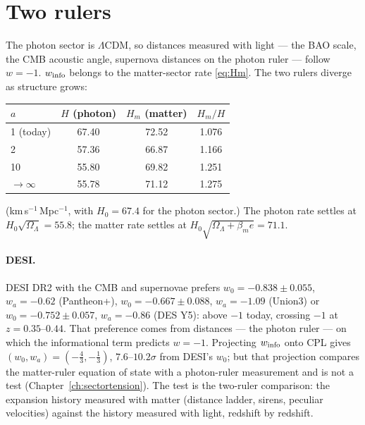 \section{Two rulers}
The photon sector is $\Lambda$CDM, so distances measured with light --- the BAO scale, the CMB acoustic angle, supernova distances on the photon
ruler --- follow $w=-1$. $w_{\rm info}$ belongs to the matter-sector rate \eqref{eq:Hm}. The two rulers diverge as structure grows:
\begin{center}\small\begin{tabular}{lccc}\toprule
$a$ & $H$ (photon) & $H_m$ (matter) & $H_m/H$\\\midrule
1 (today) & 67.40 & 72.52 & 1.076\\ 2 & 57.36 & 66.87 & 1.166\\ 10 & 55.80 & 69.82 & 1.251\\ $\to\infty$ & 55.78 & 71.12 & 1.275\\\bottomrule
\end{tabular}\end{center}
(km\,s$^{-1}$\,Mpc$^{-1}$, with $H_0=67.4$ for the photon sector.) The photon rate settles at $H_0\sqrt{\Omega_\Lambda}=55.8$; the matter rate
settles at $H_0\sqrt{\Omega_\Lambda+\beta_me}=71.1$.

\paragraph{DESI.} DESI DR2 with the CMB and supernovae prefers $w_0=-0.838\pm0.055$, $w_a=-0.62$ (Pantheon+), $w_0=-0.667\pm0.088$, $w_a=-1.09$
(Union3) or $w_0=-0.752\pm0.057$, $w_a=-0.86$ (DES Y5): above $-1$ today, crossing $-1$ at $z=0.35$--$0.44$. That preference comes from distances ---
the photon ruler --- on which the informational term predicts $w=-1$. Projecting $w_{\rm info}$ onto CPL gives $(w_0,w_a)=(-\tfrac43,-\tfrac13)$, $7.6$--$10.2\sigma$
from DESI's $w_0$; but that projection compares the matter-ruler equation of state with a photon-ruler measurement and is not a test (Chapter~\ref{ch:sectortension}).
The test is the two-ruler
comparison: the expansion history measured with matter (distance ladder, sirens, peculiar velocities) against the history measured with light,
redshift by redshift.

